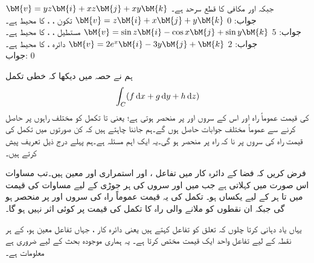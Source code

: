 \quad
$\bM{v}=yz\bM{i}+xz\bM{j}+xy\bM{k}$
جبکہ   اور  مکافی  کا قطع سرحد  ہے۔\\
جواب:\quad 
$0$
\quad
$\bM{v}=z\bM{i}+x\bM{j}+y\bM{k}$
تکون  ، ،  کا محیط  ہے۔\\
جواب:\quad 
$5$
\quad
$\bM{v}=\sin z\bM{i}-\cos x\bM{j}+\sin y\bM{k}$
مستطیل  ، ،  کا محیط  ہے۔\\
جواب:\quad 
$2$
\quad
$\bM{v}=2e^x\bM{i}-3y\bM{j}+\bM{k}$
دائرہ  ،  کا محیط  ہے۔\\
جواب:\quad 
$0$

ہم نے حصہ  میں دیکھا کہ خطی تکمل
\begin{align}\label{مساوات_خطی_تکمل_آزاد_راہ_الف}
\int_C (f\dif x+g\dif y+h\dif z)
\end{align}
کی قیمت عموماً راہ  اور اس کے سروں  اور  پر منحصر ہوتی ہے؛ یعنی  تا  تکمل کو مختلف راہوں پر حاصل کرنے سے عموماً مختلف جوابات حاصل ہوں گے۔ہم جاننا چاہتے ہیں کہ کن صورتوں میں تکمل کی قیمت راہ کی سروں پر نا کہ راہ پر منحصر ہو گی۔یہ ایک اہم مسئلہ ہے۔ہم پہلے درج ذیل تعریف پیش کرتے ہیں۔

فرض کریں کہ فضا کے دائرہ کار  میں تفاعل ،  اور  استمراری اور معین ہیں۔تب مساوات  اس صورت  میں   کہلاتی ہے جب  میں  اور  سروں کی ہر جوڑی کے لیے مساوات  کی قیمت  میں  تا  ہر  کے لیے یکساں ہو۔ تکمل کی یہ قیمت عموماً راہ کی سروں  اور  پر منحصر ہو گی جبکہ ان نقطوں کو ملانے والی راہ کا تکمل کی قیمت پر کوئی اثر نہیں ہو گا۔ 

یہاں یاد دہانی کرتا چلوں کہ    تعلق کو تفاعل کہتے ہیں یعنی دائرہ کار ،  جہاں تفاعل معین ہو، کے  ہر نقطہ کے لیے تفاعل واحد ایک  قیمت مختص  کرتا ہے۔ یہ ہماری موجودہ بحث کے لیے ضروری ہے معلومات ہے۔

